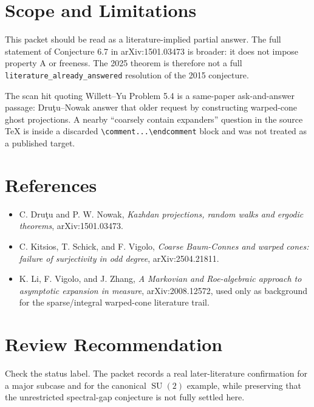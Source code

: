 \documentclass[11pt]{article}
\begin{document}
\section*{Scope and Limitations}

This packet should be read as a literature-implied partial answer.  The full
statement of Conjecture 6.7 in arXiv:1501.03473 is broader: it does not impose
property A or freeness.  The 2025 theorem is therefore not a full
\texttt{literature\_already\_answered} resolution of the 2015 conjecture.

The scan hit quoting Willett--Yu Problem 5.4 is a same-paper
ask-and-answer passage: Dru\c{t}u--Nowak answer that older request by
constructing warped-cone ghost projections.  A nearby ``coarsely contain
expanders'' question in the source TeX is inside a discarded
\verb|\comment...\endcomment| block and was not treated as a published target.

\section*{References}

\begin{itemize}
\item C. Dru\c{t}u and P. W. Nowak, \emph{Kazhdan projections, random walks
and ergodic theorems}, arXiv:1501.03473.
\item C. Kitsios, T. Schick, and F. Vigolo, \emph{Coarse Baum-Connes and
warped cones: failure of surjectivity in odd degree}, arXiv:2504.21811.
\item K. Li, F. Vigolo, and J. Zhang, \emph{A Markovian and Roe-algebraic
approach to asymptotic expansion in measure}, arXiv:2008.12572, used only as
background for the sparse/integral warped-cone literature trail.
\end{itemize}

\section*{Review Recommendation}

Check the status label.  The packet records a real later-literature
confirmation for a major subcase and for the canonical $\operatorname{SU}(2)$
example, while preserving that the unrestricted spectral-gap conjecture is
not fully settled here.
\end{document}

